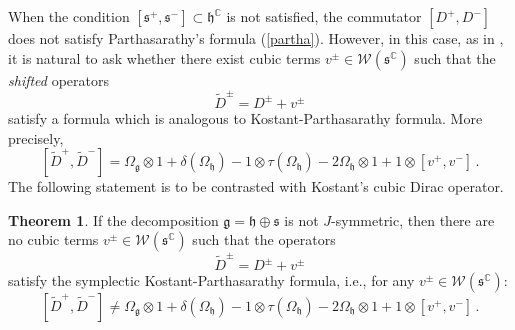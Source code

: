 \documentclass{amsart}[draft,11pt]
\newcommand{\mg}{\mathfrak{g}}
\newcommand{\mh}{\mathfrak{h}}
\newcommand{\ms}{\mathfrak{s}}
\newcommand{\weyl}{\mathcal{W}(\ms^\mathbb{C})}
\numberwithin{equation}{section}
\theoremstyle{definition}
\newtheorem{theorem}{Theorem}[section]
\begin{document}
When the condition $[\ms^+,\ms^-] \subset \mh^\mathbb{C}$ is not satisfied, the commutator $[D^+,D^-]$ does not satisfy Parthasarathy's formula (\ref{partha}).
However, in this case, as in \cite{kostant2000}, it is natural to ask whether  there exist cubic terms $v^\pm \in \weyl$ such that the {\it shifted} operators 
$$\tilde{D}^\pm = D^\pm + v^\pm$$
satisfy a formula which is analogous to Kostant-Parthasarathy formula. More precisely,
$$
[\tilde{D}^+,\tilde{D}^-] = 
\Omega_{\mg}\otimes 1 + \delta(\Omega_{\mh})-1\otimes \tau(\Omega_{\mh})- 2\Omega_\mh \otimes 1+ 1\otimes [v^+,v^-]\,.
$$
The following statement is to be contrasted with Kostant's cubic Dirac operator.
\begin{theorem}\label{rigidity}
If the decomposition $\mg= \mh \oplus \ms$ is not $J$-symmetric, then there are no cubic terms $v^\pm \in \weyl$ such that
the operators 
$$\tilde{D}^\pm = D^\pm + v^\pm$$ satisfy the symplectic Kostant-Parthasarathy formula, i.e., for any $v^\pm \in \mathcal{W}(\mathfrak{s}^\mathbb{C})$:
$$
[\tilde{D}^+,\tilde{D}^-] \neq 
\Omega_{\mg}\otimes 1 + \delta(\Omega_{\mh})-1\otimes \tau(\Omega_{\mh})- 2\Omega_\mh \otimes 1+ 1\otimes [v^+,v^-]\,.
$$
\end{theorem}
\end{document}
